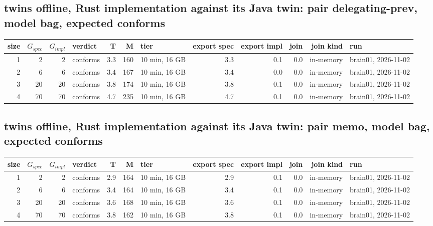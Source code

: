 \documentclass[10pt]{article}
\begin{document}
\subsection*{twins offline, Rust implementation against its Java twin: pair \textsf{delegating-prev}, model bag, expected conforms}
\begin{longtable}{@{}rrrlrrlrrrrl@{}}
\toprule
size & $G_{\mathit{spec}}$ & $G_{\mathit{impl}}$ & verdict & T & M & tier & export spec & export impl & join & join kind & run \\
\midrule
\endhead
\color{red} 1 & 2 & 2 & conforms & 3.3 & 160 & 10 min, 16 GB & 3.3 & 0.1 & 0.0 & in-memory & brain01, 2026-11-02 \\
\color{red} 2 & 6 & 6 & conforms & 3.4 & 167 & 10 min, 16 GB & 3.4 & 0.0 & 0.0 & in-memory & brain01, 2026-11-02 \\
\color{red} 3 & 20 & 20 & conforms & 3.8 & 174 & 10 min, 16 GB & 3.8 & 0.1 & 0.0 & in-memory & brain01, 2026-11-02 \\
\color{red} 4 & 70 & 70 & conforms & 4.7 & 235 & 10 min, 16 GB & 4.7 & 0.1 & 0.0 & in-memory & brain01, 2026-11-02 \\
\bottomrule
\end{longtable}
\subsection*{twins offline, Rust implementation against its Java twin: pair \textsf{memo}, model bag, expected conforms}
\begin{longtable}{@{}rrrlrrlrrrrl@{}}
\toprule
size & $G_{\mathit{spec}}$ & $G_{\mathit{impl}}$ & verdict & T & M & tier & export spec & export impl & join & join kind & run \\
\midrule
\endhead
\color{red} 1 & 2 & 2 & conforms & 2.9 & 164 & 10 min, 16 GB & 2.9 & 0.1 & 0.0 & in-memory & brain01, 2026-11-02 \\
\color{red} 2 & 6 & 6 & conforms & 3.4 & 164 & 10 min, 16 GB & 3.4 & 0.1 & 0.0 & in-memory & brain01, 2026-11-02 \\
\color{red} 3 & 20 & 20 & conforms & 3.6 & 168 & 10 min, 16 GB & 3.6 & 0.1 & 0.0 & in-memory & brain01, 2026-11-02 \\
\color{red} 4 & 70 & 70 & conforms & 3.8 & 162 & 10 min, 16 GB & 3.8 & 0.1 & 0.0 & in-memory & brain01, 2026-11-02 \\
\bottomrule
\end{longtable}
\end{document}
